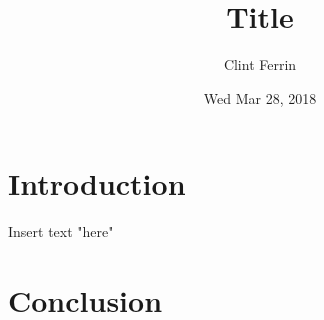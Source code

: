\title { Title            }
\author{ Clint Ferrin     }
\date  { Wed Mar 28, 2018 }
\def\class{ Class: ECE 5930 }




   \pageSetup
   \createTitlePage
   \createTableOfContents

\section{Introduction}
    Insert text "here" 

\section{Conclusion}


